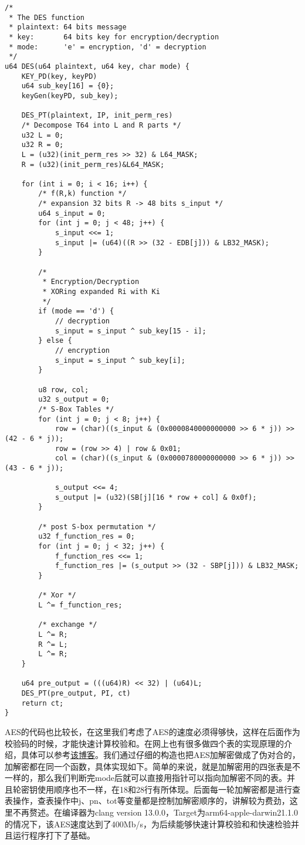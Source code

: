 \documentclass{whureport}
\begin{document}
\begin{lstlisting}
/*
 * The DES function
 * plaintext: 64 bits message
 * key:       64 bits key for encryption/decryption
 * mode:      'e' = encryption, 'd' = decryption
 */
u64 DES(u64 plaintext, u64 key, char mode) {
    KEY_PD(key, keyPD)
    u64 sub_key[16] = {0};
    keyGen(keyPD, sub_key);

    DES_PT(plaintext, IP, init_perm_res)
    /* Decompose T64 into L and R parts */
    u32 L = 0;
    u32 R = 0;
    L = (u32)(init_perm_res >> 32) & L64_MASK;
    R = (u32)(init_perm_res)&L64_MASK;

    for (int i = 0; i < 16; i++) {
        /* f(R,k) function */
        /* expansion 32 bits R -> 48 bits s_input */
        u64 s_input = 0;
        for (int j = 0; j < 48; j++) {
            s_input <<= 1;
            s_input |= (u64)((R >> (32 - EDB[j])) & LB32_MASK);
        }

        /*
         * Encryption/Decryption
         * XORing expanded Ri with Ki
         */
        if (mode == 'd') {
            // decryption
            s_input = s_input ^ sub_key[15 - i];
        } else {
            // encryption
            s_input = s_input ^ sub_key[i];
        }

        u8 row, col;
        u32 s_output = 0;
        /* S-Box Tables */
        for (int j = 0; j < 8; j++) {
            row = (char)((s_input & (0x0000840000000000 >> 6 * j)) >> (42 - 6 * j));
            row = (row >> 4) | row & 0x01;
            col = (char)((s_input & (0x0000780000000000 >> 6 * j)) >> (43 - 6 * j));

            s_output <<= 4;
            s_output |= (u32)(SB[j][16 * row + col] & 0x0f);
        }

        /* post S-box permutation */
        u32 f_function_res = 0;
        for (int j = 0; j < 32; j++) {
            f_function_res <<= 1;
            f_function_res |= (s_output >> (32 - SBP[j])) & LB32_MASK;
        }

        /* Xor */
        L ^= f_function_res;

        /* exchange */
        L ^= R;
        R ^= L;
        L ^= R;
    }

    u64 pre_output = (((u64)R) << 32) | (u64)L;
    DES_PT(pre_output, PI, ct)
    return ct;
}
\end{lstlisting}

AES的代码也比较长，在这里我们考虑了AES的速度必须得够快，这样在后面作为校验码的时候，才能快速计算校验和。在网上也有很多做四个表的实现原理的介绍，具体可以参考\href{https://zhuanlan.zhihu.com/p/42264499}{该博客}。我们通过仔细的构造也把AES加解密做成了伪对合的，加解密都在同一个函数，具体实现如下。简单的来说，就是加解密用的四张表是不一样的，那么我们判断完mode后就可以直接用指针可以指向加解密不同的表。并且轮密钥使用顺序也不一样，在18和28行有所体现。后面每一轮加解密都是进行查表操作，查表操作中j、pn、tot等变量都是控制加解密顺序的，讲解较为费劲，这里不再赘述。在编译器为clang version 13.0.0，Target为arm64-apple-darwin21.1.0的情况下，该AES速度达到了400Mb/s，为后续能够快速计算校验和和快速检验并且运行程序打下了基础。
\end{document}
